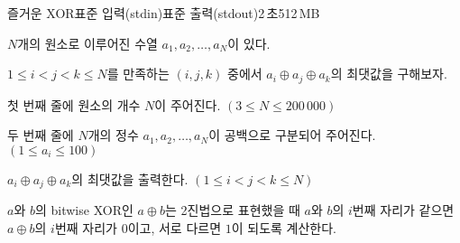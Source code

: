 \begin{problem}{즐거운 XOR}{표준 입력(stdin)}{표준 출력(stdout)}{2\,초}{512\,MB}

$N$개의 원소로 이루어진 수열 $a_1, a_2, \dots , a_N$이 있다.

$1 \le i < j < k \le N$를 만족하는 $(i, j, k)$ 중에서 $a_i \oplus a_j \oplus a_k$의 최댓값을 구해보자.

\InputFile
첫 번째 줄에 원소의 개수 $N$이 주어진다. $(3 \le N \le 200\,000)$

두 번째 줄에 $N$개의 정수 $a_1, a_2, \dots, a_N$이 공백으로 구분되어 주어진다. $(1 \le a_i \le 100)$

\OutputFile
$a_i \oplus a_j \oplus a_k$의 최댓값을 출력한다. $(1 \le i < j < k \le N)$

\Examples

\begin{example}
%
%
\end{example}
\Note
$a$와 $b$의 bitwise XOR인 $a \oplus b$는 2진법으로 표현했을 때 $a$와 $b$의 $i$번째 자리가 같으면 $a \oplus b$의 $i$번째 자리가 $0$이고, 서로 다르면 $1$이 되도록 계산한다.

\end{problem}
